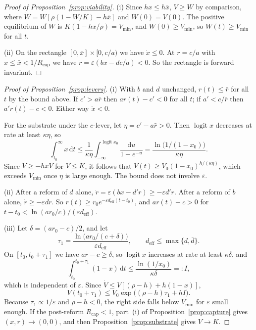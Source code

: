 \documentclass[11pt]{article}
\theoremstyle{plain}
\theoremstyle{definition}
\newcommand{\Rcap}{R_{\mathrm{cap}}}
\newcommand{\Vmin}{V_{\min}}
\newcommand{\dd}{\mathrm{d}}
\newcommand{\logit}{\operatorname{logit}}
\begin{document}
\begin{proof}[Proof of Proposition~\ref{prop:viability}]
(i) Since $hx\le h\bar x$, $V\ge W$ by comparison, where $\dot W=W[\rho(1-W/K)-h\bar x]$ and $W(0)=V(0)$. The positive equilibrium of $W$ is $K(1-h\bar x/\rho)=\Vmin$, and $W(0)\ge\Vmin$, so $W(t)\ge\Vmin$ for all $t$.

(ii) On the rectangle $[0,\bar x]\times[0,c/a)$ we have $\dot x\le0$. At $r=c/a$ with $x\le\bar x<1/\Rcap$ we have $\dot r=\varepsilon(bx-dc/a)<0$. So the rectangle is forward invariant.
\end{proof}

\begin{proof}[Proof of Proposition~\ref{prop:levers}]
(i) With $b$ and $d$ unchanged, $r(t)\le\bar r$ for all $t$ by the bound above. If $c'>a\bar r$ then $ar(t)-c'<0$ for all $t$; if $a'<c/\bar r$ then $a'r(t)-c<0$. Either way $\dot x<0$.

For the substrate under the $c$-lever, let $\eta=c'-a\bar r>0$. Then $\logit x$ decreases at rate at least $\kappa\eta$, so
\[
\int_{t_0}^\infty x\,\dd t\le\frac{1}{\kappa\eta}\int_{-\infty}^{\logit x_0}\frac{\dd u}{1+e^{-u}}=\frac{\ln\big(1/(1-x_0)\big)}{\kappa\eta}.
\]
Since $\dot V\ge-hxV$ for $V\le K$, it follows that $V(t)\ge V_0(1-x_0)^{h/(\kappa\eta)}$, which exceeds $\Vmin$ once $\eta$ is large enough. The bound does not involve $\varepsilon$.

(ii) After a reform of $d$ alone, $\dot r=\varepsilon(bx-d'r)\ge-\varepsilon d'r$. After a reform of $b$ alone, $\dot r\ge-\varepsilon dr$. So $r(t)\ge r_0e^{-\varepsilon d_{\mathrm{eff}}(t-t_0)}$, and $ar(t)-c>0$ for $t-t_0<\ln(ar_0/c)/(\varepsilon d_{\mathrm{eff}})$.

(iii) Let $\delta=(ar_0-c)/2$, and let
\[
\tau_1=\frac{\ln\big(ar_0/(c+\delta)\big)}{\varepsilon d_{\mathrm{eff}}},\qquad d_{\mathrm{eff}}\le\max\{d,\bar d\}.
\]
On $[t_0,t_0+\tau_1]$ we have $ar-c\ge\delta$, so $\logit x$ increases at rate at least $\kappa\delta$, and
\[
\int_{t_0}^{t_0+\tau_1}(1-x)\,\dd t\le\frac{\ln(1/x_0)}{\kappa\delta}=:I,
\]
which is independent of $\varepsilon$. Since $\dot V\le V[(\rho-h)+h(1-x)]$,
\[
V(t_0+\tau_1)\le V_0\exp\big((\rho-h)\tau_1+hI\big).
\]
Because $\tau_1\propto1/\varepsilon$ and $\rho-h<0$, the right side falls below $\Vmin$ for $\varepsilon$ small enough. If the post-reform $\Rcap<1$, part~(i) of Proposition~\ref{prop:capture} gives $(x,r)\to(0,0)$, and then Proposition~\ref{prop:substrate} gives $V\to K$.
\end{proof}
\end{document}
